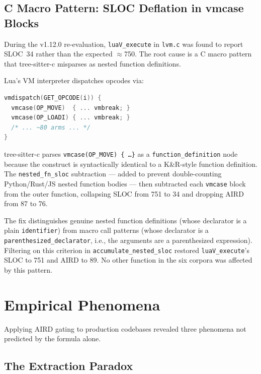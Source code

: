 \documentclass[10pt,twocolumn,letterpaper]{article}
\begin{document}
\subsection{C Macro Pattern: SLOC Deflation in vmcase Blocks}
\label{sec:vmcase}

During the v1.12.0 re-evaluation, \texttt{luaV\_execute} in
\texttt{lvm.c} was found to report SLOC~34 rather than the expected
$\approx$750.  The root cause is a C macro pattern that tree-sitter-c
misparses as nested function definitions.

Lua's VM interpreter dispatches opcodes via:

\begin{lstlisting}[language=C]
vmdispatch(GET_OPCODE(i)) {
  vmcase(OP_MOVE)  { ... vmbreak; }
  vmcase(OP_LOADI) { ... vmbreak; }
  /* ... ~80 arms ... */
}
\end{lstlisting}

tree-sitter-c parses \texttt{vmcase(OP\_MOVE) \{ \ldots \}} as a
\texttt{function\_definition} node because the construct is
syntactically identical to a K\&R-style function definition.  The
\texttt{nested\_fn\_sloc} subtraction --- added to prevent double-counting
Python/Rust/JS nested function bodies --- then subtracted each
\texttt{vmcase} block from the outer function, collapsing SLOC from 751
to 34 and dropping AIRD from 87 to 76.

The fix distinguishes genuine nested function definitions (whose
declarator is a plain \texttt{identifier}) from macro call patterns
(whose declarator is a \texttt{parenthesized\_declarator}, i.e., the
arguments are a parenthesized expression).  Filtering on this criterion
in \texttt{accumulate\_nested\_sloc} restored \texttt{luaV\_execute}'s
SLOC to 751 and AIRD to 89.  No other function in the six corpora was
affected by this pattern.

\section{Empirical Phenomena}
\label{sec:empirical}

Applying AIRD gating to production codebases revealed three phenomena
not predicted by the formula alone.

\subsection{The Extraction Paradox}
\label{sec:paradox}
\end{document}
